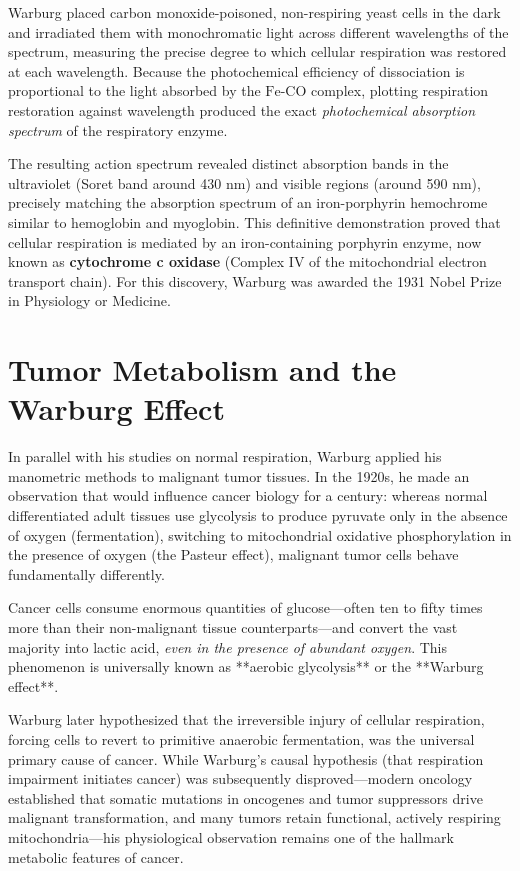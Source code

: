 Warburg placed carbon monoxide-poisoned, non-respiring yeast cells in the dark and irradiated them with monochromatic light across different wavelengths of the spectrum, measuring the precise degree to which cellular respiration was restored at each wavelength. Because the photochemical efficiency of dissociation is proportional to the light absorbed by the $\text{Fe-CO}$ complex, plotting respiration restoration against wavelength produced the exact \emph{photochemical absorption spectrum} of the respiratory enzyme. 

The resulting action spectrum revealed distinct absorption bands in the ultraviolet (Soret band around 430 nm) and visible regions (around 590 nm), precisely matching the absorption spectrum of an iron-porphyrin hemochrome similar to hemoglobin and myoglobin. This definitive demonstration proved that cellular respiration is mediated by an iron-containing porphyrin enzyme, now known as \textbf{cytochrome c oxidase} (Complex IV of the mitochondrial electron transport chain). For this discovery, Warburg was awarded the 1931 Nobel Prize in Physiology or Medicine.

\section{Tumor Metabolism and the Warburg Effect}

In parallel with his studies on normal respiration, Warburg applied his manometric methods to malignant tumor tissues. In the 1920s, he made an observation that would influence cancer biology for a century: whereas normal differentiated adult tissues use glycolysis to produce pyruvate only in the absence of oxygen (fermentation), switching to mitochondrial oxidative phosphorylation in the presence of oxygen (the Pasteur effect), malignant tumor cells behave fundamentally differently.

Cancer cells consume enormous quantities of glucose—often ten to fifty times more than their non-malignant tissue counterparts—and convert the vast majority into lactic acid, \emph{even in the presence of abundant oxygen}. This phenomenon is universally known as **aerobic glycolysis** or the **Warburg effect**.

Warburg later hypothesized that the irreversible injury of cellular respiration, forcing cells to revert to primitive anaerobic fermentation, was the universal primary cause of cancer. While Warburg's causal hypothesis (that respiration impairment initiates cancer) was subsequently disproved—modern oncology established that somatic mutations in oncogenes and tumor suppressors drive malignant transformation, and many tumors retain functional, actively respiring mitochondria—his physiological observation remains one of the hallmark metabolic features of cancer.

